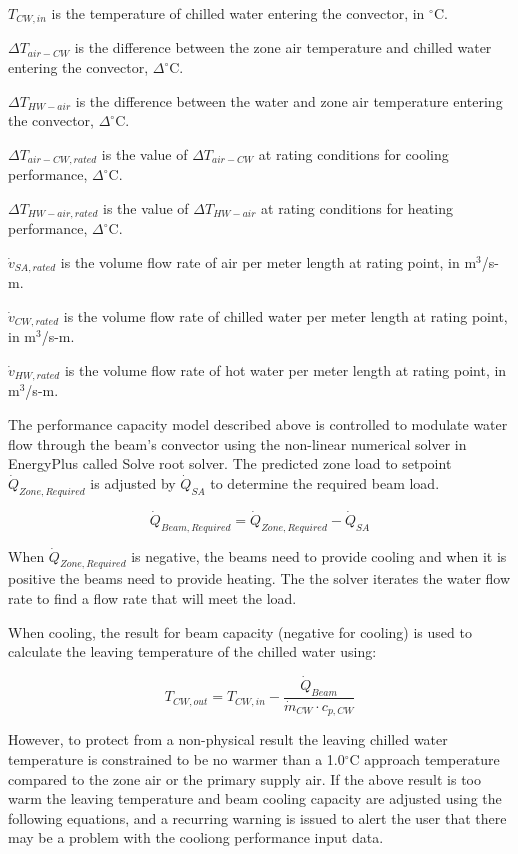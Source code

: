 \({T_{CW,in}}\) is the temperature of chilled water entering the convector, in \(^{\circ}\)C.

\({\Delta T_{air-CW}}\) is the difference between the zone air temperature and chilled water entering the convector, \(\Delta^{\circ}\)C.

\({\Delta T_{HW-air}}\) is the difference between the water and zone air temperature entering the convector, \(\Delta^{\circ}\)C.

\({\Delta T_{air-CW,rated}}\) is the value of \({\Delta T_{air-CW}}\) at rating conditions for cooling performance, \(\Delta^{\circ}\)C.

\({\Delta T_{HW-air,rated}}\) is the value of \({\Delta T_{HW-air}}\) at rating conditions for heating performance, \(\Delta^{\circ}\)C.

\({\dot v_{SA,rated}}\) is the volume flow rate of air per meter length at rating point, in m\(^{3}\)/s-m.

\({\dot v_{CW,rated}}\) is the volume flow rate of chilled water per meter length at rating point, in m\(^{3}\)/s-m.

\({\dot v_{HW,rated}}\) is the volume flow rate of hot water per meter length at rating point, in m\(^{3}\)/s-m.

The performance capacity model described above is controlled to modulate water flow through the beam's convector using the non-linear numerical solver in EnergyPlus called Solve root solver. The predicted zone load to setpoint \({\dot Q_{Zone, Required}}\) is adjusted by \({\dot Q_{SA}}\) to determine the required beam load.

\begin{equation}
{\dot Q_{Beam, Required}} = {\dot Q_{Zone, Required}} - {\dot Q_{SA}}
\end{equation}

When \({\dot Q_{Zone, Required}}\) is negative, the beams need to provide cooling and when it is positive the beams need to provide heating. The the solver iterates the water flow rate to find a flow rate that will meet the load.

When cooling, the result for beam capacity (negative for cooling) is used to calculate the leaving temperature of the chilled water using:

\begin{equation}
{T_{CW,out}} = {T_{CW,in}} - \frac{{\dot Q_{Beam}}}{{\dot m_{CW}} \cdot {c_{p,CW}} }
\end{equation}

However, to protect from a non-physical result the leaving chilled water temperature is constrained to be no warmer than a 1.0\(^{\circ}\)C approach temperature compared to the zone air or the primary supply air. If the above result is too warm the leaving temperature and beam cooling capacity are adjusted using the following equations, and a recurring warning is issued to alert the user that there may be a problem with the cooliong performance input data.

